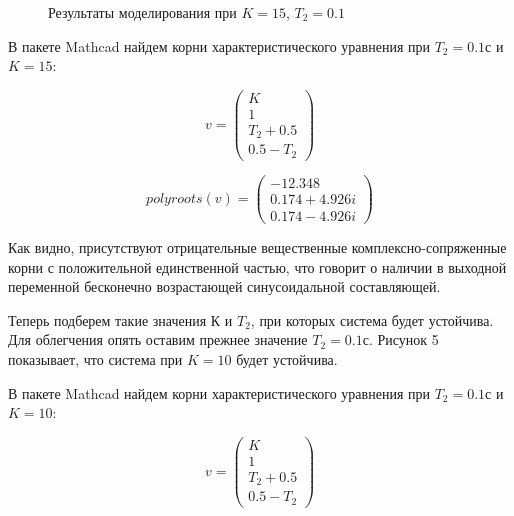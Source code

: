 \documentclass[a4paper, 11pt]{article}
\begin{document}
\begin{figure}[h!]
\centering
{}
\caption{Результаты моделирования при $K=15$, $T_2=0.1$}
\end{figure}

\par 
	В пакете Mathcad найдем корни характеристического уравнения при $T_2=0.1 с$ и $K=15$:

\begin{equation}
v=\left(
\begin{matrix}
K \\
1 \\
T_2+0.5 \\
0.5-T_2
\end{matrix}
\right)
\end{equation}

\begin{equation}
polyroots(v)=\left(
\begin{matrix}
-12.348 \\
0.174+4.926i \\
0.174-4.926i 
\end{matrix}
\right)
\end{equation}

\par 
	Как видно, присутствуют отрицательные вещественные комплексно-сопряженные корни с положительной единственной частью, что говорит о наличии в выходной переменной бесконечно возрастающей синусоидальной составляющей.
\par 
	Теперь подберем такие значения $К$ и $T_2$, при которых система будет устойчива. Для облегчения опять оставим прежнее значение $T_2=0.1 с$. Рисунок 5 показывает, что система при $K = 10$ будет устойчива.
\par 
	В пакете Mathcad найдем корни характеристического уравнения при $T_2=0.1 с$ и $K=10$:
\par 
\begin{equation}
v=\left(
\begin{matrix}
K \\
1 \\
T_2+0.5 \\
0.5-T_2
\end{matrix}
\right)
\end{equation}
\end{document}
